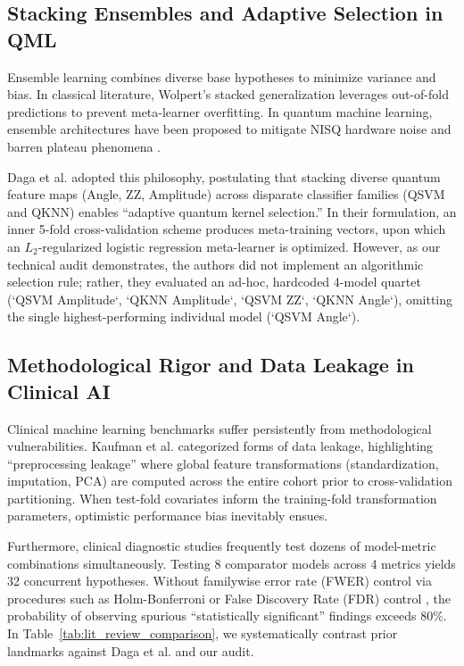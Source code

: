 \documentclass[journal,twocolumn]{IEEEtran}
\begin{document}
\subsection{Stacking Ensembles and Adaptive Selection in QML}
Ensemble learning combines diverse base hypotheses to minimize variance and bias. In classical literature, Wolpert's stacked generalization \cite{wolpert1992stacked} leverages out-of-fold predictions to prevent meta-learner overfitting. In quantum machine learning, ensemble architectures have been proposed to mitigate NISQ hardware noise and barren plateau phenomena \cite{mcclean2018barren}. 

Daga et al. \cite{daga2026adaptive} adopted this philosophy, postulating that stacking diverse quantum feature maps (Angle, ZZ, Amplitude) across disparate classifier families (QSVM and QKNN) enables ``adaptive quantum kernel selection.'' In their formulation, an inner 5-fold cross-validation scheme produces meta-training vectors, upon which an $L_2$-regularized logistic regression meta-learner is optimized. However, as our technical audit demonstrates, the authors did not implement an algorithmic selection rule; rather, they evaluated an ad-hoc, hardcoded 4-model quartet (`QSVM Amplitude`, `QKNN Amplitude`, `QSVM ZZ`, `QKNN Angle`), omitting the single highest-performing individual model (`QSVM Angle`).

\subsection{Methodological Rigor and Data Leakage in Clinical AI}
Clinical machine learning benchmarks suffer persistently from methodological vulnerabilities. Kaufman et al. \cite{kaufman2012leakage} categorized forms of data leakage, highlighting ``preprocessing leakage'' where global feature transformations (standardization, imputation, PCA) are computed across the entire cohort prior to cross-validation partitioning. When test-fold covariates inform the training-fold transformation parameters, optimistic performance bias inevitably ensues. 

Furthermore, clinical diagnostic studies frequently test dozens of model-metric combinations simultaneously. Testing 8 comparator models across 4 metrics yields 32 concurrent hypotheses. Without familywise error rate (FWER) control via procedures such as Holm-Bonferroni \cite{holm1979simple} or False Discovery Rate (FDR) control \cite{benjamini1995controlling}, the probability of observing spurious ``statistically significant'' findings exceeds $80\%$. In Table~\ref{tab:lit_review_comparison}, we systematically contrast prior landmarks against Daga et al. and our audit.
\end{document}
